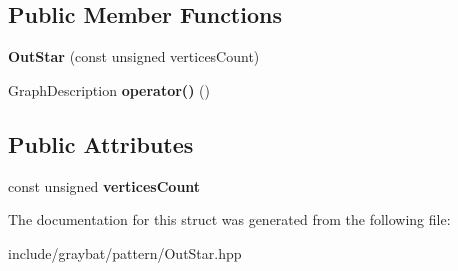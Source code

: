 \subsection*{Public Member Functions}
\begin{DoxyCompactItemize}
\item 
\hypertarget{structgraybat_1_1pattern_1_1OutStar_a210b0709162c18720d2ad707d39c97af}{}{\bfseries Out\+Star} (const unsigned vertices\+Count)\label{structgraybat_1_1pattern_1_1OutStar_a210b0709162c18720d2ad707d39c97af}

\item 
\hypertarget{structgraybat_1_1pattern_1_1OutStar_a4524b5ced8b3a42839b1d652eba27264}{}Graph\+Description {\bfseries operator()} ()\label{structgraybat_1_1pattern_1_1OutStar_a4524b5ced8b3a42839b1d652eba27264}

\end{DoxyCompactItemize}
\subsection*{Public Attributes}
\begin{DoxyCompactItemize}
\item 
\hypertarget{structgraybat_1_1pattern_1_1OutStar_ab5bc037b1f31514b277adbf771191424}{}const unsigned {\bfseries vertices\+Count}\label{structgraybat_1_1pattern_1_1OutStar_ab5bc037b1f31514b277adbf771191424}

\end{DoxyCompactItemize}


The documentation for this struct was generated from the following file\+:\begin{DoxyCompactItemize}
\item 
include/graybat/pattern/Out\+Star.\+hpp\end{DoxyCompactItemize}

